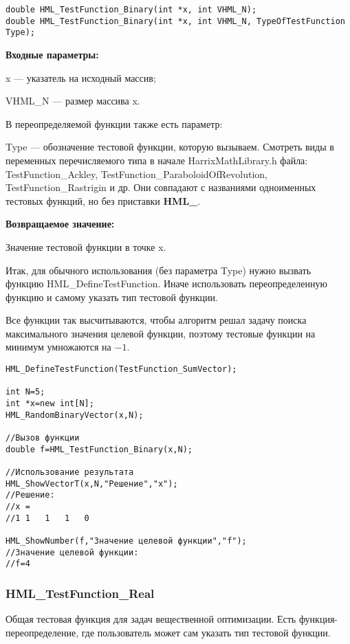 \documentclass[a4paper,12pt]{article}
\begin{document}
\begin{lstlisting}[label=code_syntax_HML_TestFunction_Binary,caption=Синтаксис]
double HML_TestFunction_Binary(int *x, int VHML_N);
double HML_TestFunction_Binary(int *x, int VHML_N, TypeOfTestFunction Type);
\end{lstlisting}

\textbf{Входные параметры:}

x --- указатель на исходный массив;

VHML\_N --- размер массива x.

В переопределяемой функции также есть параметр:
  
Type --- обозначение тестовой функции, которую вызываем.
Смотреть виды в переменных перечисляемого типа в начале HarrixMathLibrary.h файла: TestFunction\_Ackley, TestFunction\_ParaboloidOfRevolution, TestFunction\_Rastrigin и др. Они совпадают с названиями одноименных тестовых функций, но без приставки \textbf{HML\_}.

\textbf{Возвращаемое значение:}
 
Значение тестовой функции в точке x.

Итак, для обычного использования (без параметра Type) нужно вызвать функцию HML\_DefineTestFunction. Иначе использовать переопределенную функцию и самому указать тип тестовой функции.

Все функции так высчитываются, чтобы алгоритм решал задачу поиска максимального значения целевой функции, поэтому тестовые функции на минимум умножаются на $-1$.


\begin{lstlisting}[label=code_use_HML_TestFunction_Binary,caption=Пример использования]
HML_DefineTestFunction(TestFunction_SumVector);

int N=5;
int *x=new int[N];
HML_RandomBinaryVector(x,N);

//Вызов функции
double f=HML_TestFunction_Binary(x,N);

//Использование результата
HML_ShowVectorT(x,N,"Решение","x");
//Решение:
//x =
//1	1	1	1	0

HML_ShowNumber(f,"Значение целевой функции","f");
//Значение целевой функции:
//f=4
\end{lstlisting}

\subsubsection{HML\_TestFunction\_Real}\label{HML_TestFunction_Real}

Общая тестовая функция для задач вещественной оптимизации. Есть функция-переопределение, где пользователь может сам указать тип тестовой функции.
\end{document}
